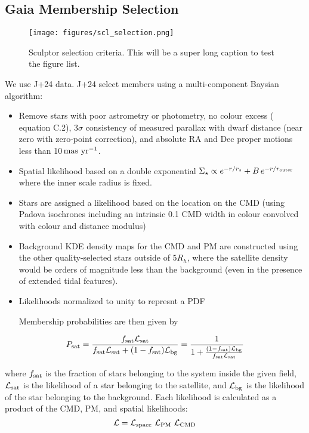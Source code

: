 \subsection{Gaia Membership Selection}\label{gaia-membership-selection}

\begin{figure}
\centering
\texttt{[image: figures/scl\_selection.png]}
\caption{Sculptor selection criteria. This will be a super long caption
to test the figure list.}\label{fig:sculptor_selection}
\end{figure}

We use J+24 data. J+24 select members using a multi-component Baysian
algorithm:

\begin{itemize}
\item
  Remove stars with poor astrometry or photometry, no colour excess
  (\citet{lindegren+2018} equation C.2), 3\(\sigma\) consistency of
  measured parallax with dwarf distance (near zero with
  \citet{lindegren+2018} zero-point correction), and absolute RA and Dec
  proper motions less than 10\(\,{\rm mas\ yr^{-1}}\).
\item
  Spatial likelihood based on a double exponential
  \(\Sigma_\star \propto e^{-r/r_s} + B\,e^{-r/r_{\rm outer}}\) where
  the inner scale radius is fixed.
\item
  Stars are assigned a likelihood based on the location on the CMD
  (using Padova isochrones including an intrinsic 0.1 CMD width in
  colour convolved with colour and distance modulus)
\item
  Background KDE density maps for the CMD and PM are constructed using
  the other quality-selected stars outside of \(5R_h\), where the
  satellite density would be orders of magnitude less than the
  background (even in the presence of extended tidal features).
\item
  Likelihoods normalized to unity to represnt a PDF

  Membership probabilities are then given by
\end{itemize}

\[
P_{\rm sat} = \frac{f_{\rm sat}{\cal L}_{\rm sat}}{f_{\rm sat}{\cal L}_{\rm sat} + (1-f_{\rm sat}){\cal L}_{\rm bg}} = \frac{1}{1 + \frac{(1-f_{\rm sat}){\cal L}_{\rm bg}}{f_{\rm sat}{\cal L}_{\rm sat} }}
\]

where \(f_{\rm sat}\) is the fraction of stars belonging to the system
inside the given field, \({\cal L}_{\rm sat}\) is the likelihood of a
star belonging to the satellite, and \({\cal L}_{\rm bg}\) is the
likelihood of the star belonging to the background. Each likelihood is
calculated as a product of the CMD, PM, and spatial likelihoods: \[
{\cal L} = {\cal L}_{\rm space}\ {\cal L}_{\rm PM}\ {\cal L}_{\rm CMD}
\]


